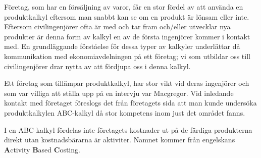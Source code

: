 Företag, som har en försäljning av varor, får en stor fördel av att använda en produktkalkyl eftersom man snabbt kan se om en produkt är lönsam eller inte.
Eftersom civilingenjörer ofta är med och tar fram och/eller utvecklar nya produkter är denna form av kalkyl en av de första ingenjörer kommer i kontakt med.
En grundläggande förståelse för dessa typer av kalkyler underlättar då kommunikation med ekonomiavdelningen på ett företag; vi som utbildar oss till civilingenjörer drar nytta av att fördjupa oss i denna kalkyl. 

Ett företag som tillämpar produktkalkyl, har stor vikt vid deras ingenjörer och som var villiga att ställa upp på en intervju var Macgregor. 
Vid inledande kontakt med företaget föreslogs det från företagets sida att man kunde undersöka produktkalkylen ABC-kalkyl då stor kompetens inom just det området fanns.



I en ABC-kalkyl fördelas inte företagets kostnader ut på de färdiga produkterna direkt utan kostnadsbärarna är aktiviter.
Namnet kommer från engelskans {\bf A}ctivity {\bf B}ased {\bf C}osting.




%
%

